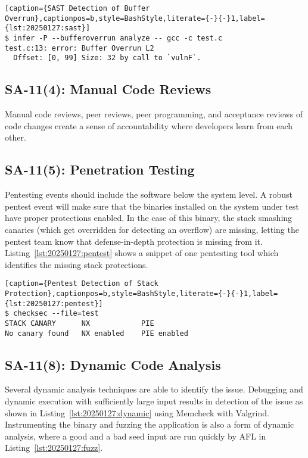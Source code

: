 \begin{lstlisting}[caption={SAST Detection of Buffer Overrun},captionpos=b,style=BashStyle,literate={-}{-}1,label={lst:20250127:sast}]
$ infer -P --bufferoverrun analyze -- gcc -c test.c
test.c:13: error: Buffer Overrun L2
  Offset: [0, 99] Size: 32 by call to `vulnF`.
\end{lstlisting}

\subsection*{SA-11(4): Manual Code Reviews}
Manual code reviews, peer reviews, peer programming, and acceptance reviews of code changes create a sense of accountability where developers learn from each other.

\subsection*{SA-11(5): Penetration Testing}
Pentesting events should include the software below the system level. A robust pentest event will make sure that the binaries installed on the system under test have proper protections enabled. In the case of this binary, the stack smashing canaries (which get overridden for detecting an overflow) are missing, letting the pentest team know that defense-in-depth protection is missing from it. Listing~\ref{lst:20250127:pentest} shows a snippet of one pentesting tool which identifies the missing stack protections.

\begin{lstlisting}[caption={Pentest Detection of Stack Protection},captionpos=b,style=BashStyle,literate={-}{-}1,label={lst:20250127:pentest}]
$ checksec --file=test
STACK CANARY      NX            PIE
No canary found   NX enabled    PIE enabled
\end{lstlisting}

\subsection*{SA-11(8): Dynamic Code Analysis}
Several dynamic analysis techniques are able to identify the issue. Debugging and dynamic execution with sufficiently large input results in detection of the issue as shown in Listing~\ref{lst:20250127:dynamic} using Memcheck with Valgrind. Instrumenting the binary and fuzzing the application is also a form of dynamic analysis, where a good and a bad seed input are run quickly by AFL in Listing~\ref{lst:20250127:fuzz}.

